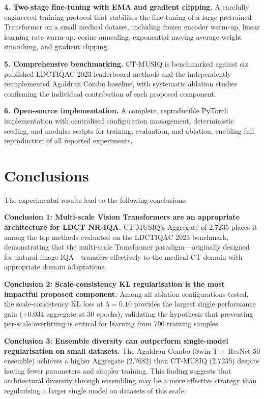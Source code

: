 \textbf{4. Two-stage fine-tuning with EMA and gradient clipping.} A carefully engineered
training protocol that stabilises the fine-tuning of a large pretrained Transformer on
a small medical dataset, including frozen encoder warm-up, linear learning rate warm-up,
cosine annealing, exponential moving average weight smoothing, and gradient clipping.

\textbf{5. Comprehensive benchmarking.} CT-MUSIQ is benchmarked against six published
LDCTIQAC 2023 leaderboard methods and the independently reimplemented Agaldran Combo
baseline, with systematic ablation studies confirming the individual contribution of each
proposed component.

\textbf{6. Open-source implementation.} A complete, reproducible PyTorch implementation
with centralised configuration management, deterministic seeding, and modular scripts
for training, evaluation, and ablation, enabling full reproduction of all reported
experiments.


\section{Conclusions}
\label{sec:conc_conclusions}

The experimental results lead to the following conclusions:

\textbf{Conclusion 1: Multi-scale Vision Transformers are an appropriate architecture
for LDCT NR-IQA.} CT-MUSIQ's Aggregate of 2.7235 places it among the top methods
evaluated on the LDCTIQAC 2023 benchmark, demonstrating that the multi-scale Transformer
paradigm---originally designed for natural image IQA---transfers effectively to the
medical CT domain with appropriate domain adaptations.

\textbf{Conclusion 2: Scale-consistency KL regularisation is the most impactful
proposed component.} Among all ablation configurations tested, the scale-consistency KL
loss at $\lambda = 0.10$ provides the largest single performance gain (+0.034 aggregate
at 30 epochs), validating the hypothesis that preventing per-scale overfitting is critical
for learning from 700 training samples.

\textbf{Conclusion 3: Ensemble diversity can outperform single-model regularisation on
small datasets.} The Agaldran Combo (Swin-T + ResNet-50 ensemble) achieves a higher
Aggregate (2.7682) than CT-MUSIQ (2.7235) despite having fewer parameters and simpler
training. This finding suggests that architectural diversity through ensembling may be
a more effective strategy than regularising a larger single model on datasets of this
scale.

